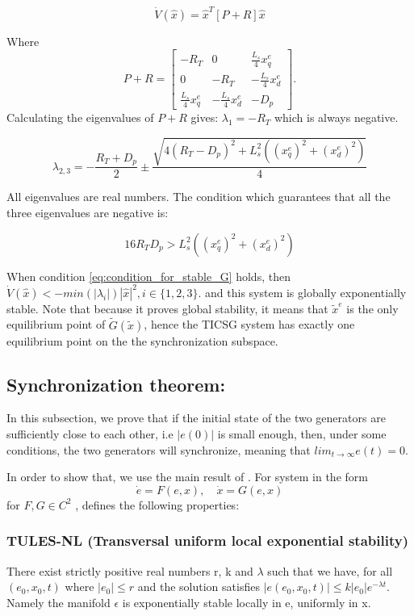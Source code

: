 \documentclass[letterpaper, 10 pt, conference]{ieeeconf}  %
\begin{document}
\[
\dot{V}(\hat{x})=\hat{x}^{T}\left[P+R\right]\hat{x}
\]

Where 
$$P+R=\left[\begin{array}{ccc}
-R_T & 0 & \frac{L_{s}}{4}x_{q}^{e}\\
0 & -R_T & -\frac{L_{s}}{4}x_{d}^{e}\\
\frac{L_{s}}{4}x_{q}^{e} & -\frac{L_{s}}{4}x_{d}^{e} & -D_{p}
\end{array}\right].$$
 Calculating the eigenvalues of $P+R$ gives:
 $\lambda_{1}=-R_T$
which is always negative. 

$$
\lambda_{2,3}=-\frac{R_T+D_{p}}{2} \pm\frac{\sqrt{4\left(R_T-D_{p}\right)^{2}+L_{s}^{2}\left(\left(x_{q}^{e}\right)^{2}+\left(x_{d}^{e}\right)^{2}\right)}}{4}
$$

All eigenvalues are real numbers. The condition which guarantees that all the three eigenvalues are negative is:

\begin{equation}
16 R_TD_{p}>L_{s}^{2}\left(\left(x_{q}^{e}\right)^{2}+\left(x_{d}^{e}\right)^{2}\right)\label{eq:condition_for_stable_G}
\end{equation}

When  condition \eqref{eq:condition_for_stable_G} holds, then $\dot{V}(\hat{x})<-min\left(\left|\lambda_{i}\right|\right)|\hat{x}|^{2},i\in\{1,2,3\}$.
and this system is globally exponentially stable. Note that because it proves global stability, it  means that $\tilde{x}^{e}$ is the only equilibrium point of $\tilde{G}(\tilde{x})$,
hence the TICSG system has exactly one equilibrium point on the the synchronization subspace.

\subsection{Synchronization theorem:}

In this subsection, we prove that if the initial state of the two generators
are sufficiently close to each other, i.e $|e(0)|$ is small enough, then, under some conditions, the two generators will synchronize, meaning that $lim_{t\to\infty}e(t)=0$.

In order to show that, we use the main result of \cite{AndrieuJayawardhanaPraly}. For system in the form 
$$ \dot{e} = F\left(e,x\right),\quad \dot{x} = G\left(e,x\right)$$ for   $F, G \in C^2$ , \cite{AndrieuJayawardhanaPraly} defines the following properties:

\subsubsection{TULES-NL (Transversal uniform local exponential stability)}
There exist strictly positive real numbers r, k and $\lambda$ such that we have, for all $\left(e_0, x_0, t\right)$  where $\left| e_0\right| \le r$ and the solution satisfies $\left|e\left(e_0, x_0, t\right)\right| \le k\left|e_0\right| e^{-\lambda t}$. Namely the manifold $\epsilon$ is exponentially stable locally in e, uniformly in x.
\end{document}
